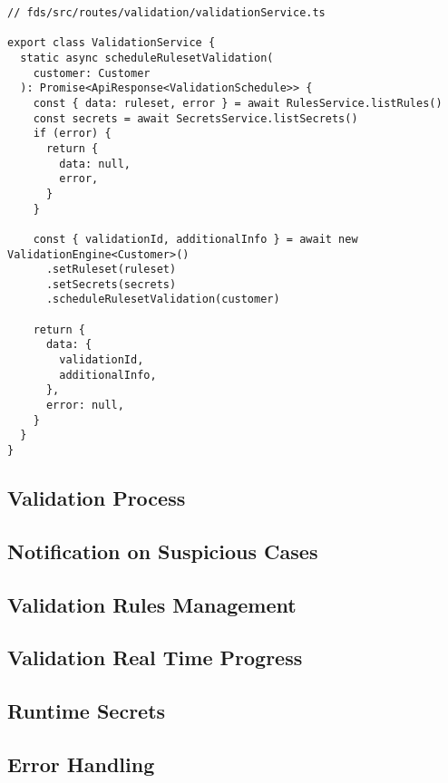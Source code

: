     \begin{lstlisting}[style=es6, caption={ValidationService schedule validation implementation (TypeScript)}]
// fds/src/routes/validation/validationService.ts

export class ValidationService {
  static async scheduleRulesetValidation(
    customer: Customer
  ): Promise<ApiResponse<ValidationSchedule>> {
    const { data: ruleset, error } = await RulesService.listRules()
    const secrets = await SecretsService.listSecrets()
    if (error) {
      return {
        data: null,
        error,
      }
    }

    const { validationId, additionalInfo } = await new ValidationEngine<Customer>()
      .setRuleset(ruleset)
      .setSecrets(secrets)
      .scheduleRulesetValidation(customer)

    return {
      data: {
        validationId,
        additionalInfo,
      },
      error: null,
    }
  }
}
    \end{lstlisting}

  \subsection{Validation Process}
    \label{sub:process}

  \subsection{Notification on Suspicious Cases}

  \subsection{Validation Rules Management}

  \subsection{Validation Real Time Progress}

  \subsection{Runtime Secrets}
    \label{sub:secrets} 

  \subsection{Error Handling}

